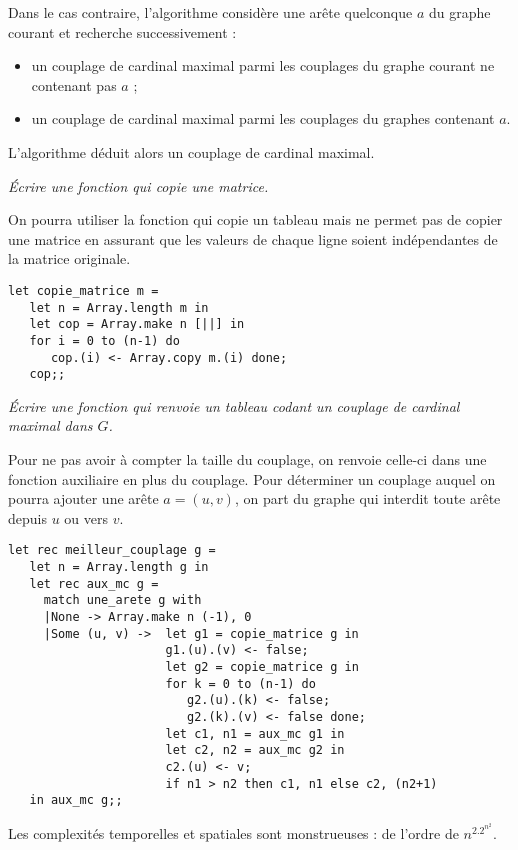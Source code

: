 Dans le cas contraire, l'algorithme considère une arête quelconque $a$ du graphe courant et recherche successivement :
\begin{itemize}
  \item un couplage de cardinal maximal parmi les couplages du graphe courant ne contenant pas $a$ ;
  \item un couplage de cardinal maximal parmi les couplages du graphes contenant $a$.
\end{itemize}
L'algorithme déduit alors un couplage de cardinal maximal.
\begin{Exercise}[title=]\it
Écrire une fonction  qui copie une matrice. 

On pourra utiliser la fonction  qui copie un tableau mais ne permet pas de copier une matrice en assurant que les valeurs de chaque ligne soient indépendantes de la matrice originale.
\end{Exercise}
\begin{Answer}
\begin{lstlisting}
let copie_matrice m = 
   let n = Array.length m in
   let cop = Array.make n [||] in
   for i = 0 to (n-1) do
      cop.(i) <- Array.copy m.(i) done;
   cop;;
\end{lstlisting}
\newpage
\end{Answer}
\begin{Exercise}[title=]\it
Écrire une fonction  qui renvoie un tableau codant un couplage de cardinal maximal dans $G$.
\end{Exercise}
\begin{Answer}
Pour ne pas avoir à compter la taille du couplage, on renvoie celle-ci dans une fonction auxiliaire en plus du couplage. Pour déterminer un couplage auquel on pourra ajouter une arête $a=(u, v)$, on part du graphe qui interdit toute arête depuis $u$ ou vers $v$.
\begin{lstlisting}
let rec meilleur_couplage g =
   let n = Array.length g in
   let rec aux_mc g =
     match une_arete g with
     |None -> Array.make n (-1), 0
     |Some (u, v) ->  let g1 = copie_matrice g in
                      g1.(u).(v) <- false;
                      let g2 = copie_matrice g in
                      for k = 0 to (n-1) do
                         g2.(u).(k) <- false;
                         g2.(k).(v) <- false done;
                      let c1, n1 = aux_mc g1 in
                      let c2, n2 = aux_mc g2 in
                      c2.(u) <- v;
                      if n1 > n2 then c1, n1 else c2, (n2+1)
   in aux_mc g;;
\end{lstlisting}
Les complexités temporelles et spatiales sont monstrueuses : de l'ordre de $n^2.2^{n^2}$.
\end{Answer}
